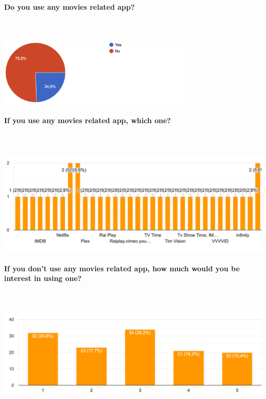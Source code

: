 \documentclass[12pt, a4paper]{article}
\begin{document}
\paragraph{Do you use any movies related app?}\mbox{}\\\\
\includegraphics[width=0.7\textwidth]{Images/app.png}\\

\paragraph{If you use any movies related app, which one?}\mbox{}\\\\
\includegraphics[width=1\textwidth]{images/appUsed.png}\\

\paragraph{If you don't use any movies related app, how much would you be interest in using one?}\mbox{}\\\\
\includegraphics[width=1\textwidth]{images/interesting.png}\\
\end{document}
